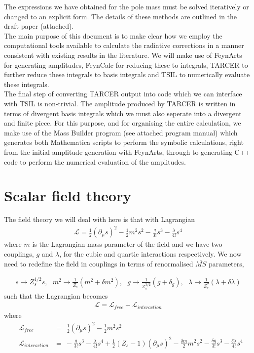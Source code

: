 \documentclass[11pt]{article}
\newcommand{\mb}{\textsf{Mass Builder} \! }
\newcommand{\tsil}{\textsf{TSIL} \! }
\newcommand{\tarcer}{\textsf{TARCER} \! }
\begin{document}
The expressions we have obtained for the pole mass must be solved iteratively or changed to an explicit form.  The details of these methods are outlined in the draft paper (attached).\\

The main purpose of this document is to make clear how we employ the computational tools available to calculate the radiative corrections in a manner consistent with existing results in the literature.  We will make use of FeynArts \cite{Hahn2000} for generating amplitudes, FeynCalc \cite{Mertig1991,Shtabovenko2016} for reducing these to integrals, TARCER \cite{Mertig1998} to further reduce these integrals to basis integrals and TSIL \cite{Martin2006} to numerically evaluate these integrals.\\

The final step of converting \tarcer output into code which we can interface with \tsil is non-trivial.  The amplitude produced by \tarcer is written in terms of divergent basis integrals which we must also seperate into a divergent and finite piece.  For this purpose, and for organising the entire calculation, we make use of the \mb program (see attached program manual) which generates both Mathematica scripts to perform the symbolic calculations, right from the initial amplitude generation with FeynArts, through to generating C++ code to perform the numerical evaluation of the amplitudes.


\section{Scalar field theory}

The field theory we will deal with here is that with Lagrangian
\begin{align}
\mathcal{L} = \frac{1}{2}(\partial_{\mu} s)^2-\frac{1}{2}m^2s^2-\frac{g}{3!}s^3-\frac{\lambda}{4!}s^4
\end{align}
where $m$ is the Lagrangian mass parameter of the field and we have two couplings, $g$ and $\lambda$, for the cubic and quartic interactions respectively.  We now need to redefine the field in couplings in terms of renormalised $\overline{MS}$ parameters,

\begin{align}
s\rightarrow Z^{1/2}_ss, \ \ \ m^2\rightarrow\frac{1}{Z_s}(m^2+\delta m^2),  \ \ \ g\rightarrow \frac{1}{Z_s^{3/2}}(g+\delta_g), \ \ \ \lambda\rightarrow \frac{1}{Z_s^2}(\lambda+\delta\lambda)
\end{align}
such that the Lagrangian becomes
\begin{align}
\mathcal{L} = \mathcal{L}_{free}+\mathcal{L}_{interaction}
\end{align}
where
\begin{eqnarray}
&\mathcal{L}_{free} &=  \ \ \frac{1}{2}(\partial_{\mu} s)^2-\frac{1}{2}m^2s^2\\
&\mathcal{L}_{interaction} &= \ -\frac{g}{3!}s^3-\frac{\lambda}{4!}s^4  +\frac{1}{2}(Z_s-1)(\partial_{\mu} s)^2 -\frac{\delta m}{2}m^2s^2-\frac{\delta g}{3!}s^3-\frac{\delta \lambda}{4!}s^4
\end{eqnarray}
\end{document}
